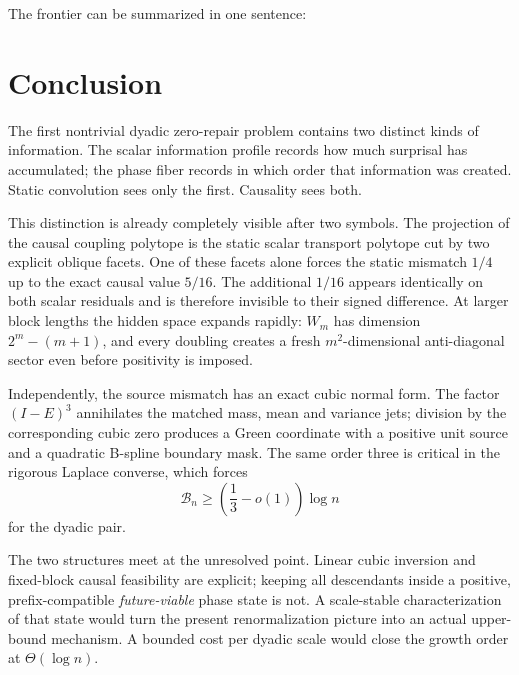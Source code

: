\documentclass[11pt,a4paper]{article}
\theoremstyle{definition}
\theoremstyle{remark}
\newcommand{\cB}{\mathcal B}
\begin{document}
The frontier can be summarized in one sentence:
\begin{center}
\end{center}

\section{Conclusion}

The first nontrivial dyadic zero-repair problem contains two distinct kinds of
information.  The scalar information profile records how much surprisal has
accumulated; the phase fiber records in which order that information was
created.  Static convolution sees only the first.  Causality sees both.

This distinction is already completely visible after two symbols.  The
projection of the causal coupling polytope is the static scalar transport
polytope cut by two explicit oblique facets.  One of these facets alone forces
the static mismatch $1/4$ up to the exact causal value $5/16$.  The additional
$1/16$ appears identically on both scalar residuals and is therefore invisible
to their signed difference.  At larger block lengths the hidden space expands
rapidly: $W_m$ has dimension $2^m-(m+1)$, and every doubling creates a fresh
$m^2$-dimensional anti-diagonal sector even before positivity is imposed.

Independently, the source mismatch has an exact cubic normal form.  The factor
$(I-E)^3$ annihilates the matched mass, mean and variance jets; division by the
corresponding cubic zero produces a Green coordinate with a positive unit
source and a quadratic B-spline boundary mask.  The same order three is
critical in the rigorous Laplace converse, which forces
\[
 \cB_n\ge\left(\frac13-o(1)\right)\log n
\]
for the dyadic pair.

The two structures meet at the unresolved point.  Linear cubic inversion and
fixed-block causal feasibility are explicit; keeping all descendants inside a
positive, prefix-compatible \emph{future-viable} phase state is not.  A
scale-stable characterization of that state would turn the present
renormalization picture into an actual upper-bound mechanism.  A bounded cost per dyadic scale would close the growth
order at $\Theta(\log n)$.
\end{document}
